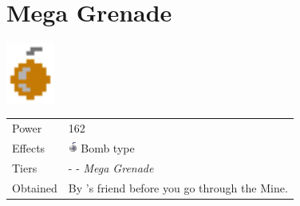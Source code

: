 \section{Mega Grenade}
\label{weapon:mega_grenade}

\includegraphics[height=2cm,keepaspectratio]{./resources/weapons/megagrenade}

\begin{longtable}{ l p{9cm} }
	Power
	& 162
\\ %
	Effects
	& \includegraphics[height=1em,keepaspectratio]{./resources/effects/bomb}
	Bomb type
\\ %
	Tiers
	& \nameref{weapon:bomb} - \nameref{weapon:jumbo_bomb} - \textit{Mega Grenade}
\\ %
	Obtained
	& By \nameref{char:arion}’s friend before you go through the Mine.
\end{longtable}
